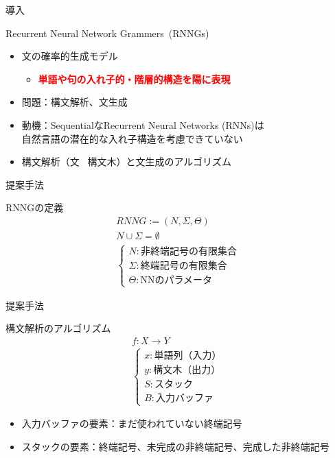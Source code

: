 \documentclass[aspectratio=43,unicode,10pt]{beamer}
\title{\thetitle}
\institute{知能数理研究室}
\author{外山洋太、三輪誠、佐々木裕}
\date{\today}
\newcommand{\fire}[1]{\textcolor{red}{\textbf{#1}}}
\newcommand{\opennt}{未完成の非終端記号}
\newcommand{\thetitle}{Recurrent Neural Network Grammers}
\begin{document}
\begin{frame}
  \titlepage
\end{frame}

\begin{frame}{導入}
  \begin{block}{\thetitle~(RNNGs)}
    \begin{itemize}
      \item 文の確率的生成モデル
        \begin{itemize}
          \item \fire{単語や句の入れ子的・階層的構造を陽に表現}
        \end{itemize}
      \item 問題：構文解析、文生成
      \item 動機：SequentialなRecurrent Neural Networks (RNNs)は \\
            自然言語の潜在的な入れ子構造を考慮できていない
      \item 構文解析（文 \rightarrow~構文木）と文生成のアルゴリズム
    \end{itemize}
  \end{block}
\end{frame}

\begin{frame}{提案手法}
  \begin{block}{RNNGの定義}
    \begin{gather*}
      RNNG := (N, \Sigma, \Theta) \\
      N \cup \Sigma = \emptyset \\
      \begin{cases}
        N: \text{非終端記号の有限集合} \\
        \Sigma: \text{終端記号の有限集合} \\
        \Theta: \text{NNのパラメータ}
      \end{cases}
    \end{gather*}
  \end{block}
\end{frame}

\begin{frame}{提案手法}
  \begin{block}{構文解析のアルゴリズム}
    \begin{gather*}
      f: X \rightarrow Y \\
      \begin{cases}
        x: \text{単語列（入力）} \\
        y: \text{構文木（出力）} \\
        S: \text{スタック} \\
        B: \text{入力バッファ}
      \end{cases}
    \end{gather*}
    \begin{itemize}
      \item 入力バッファの要素：まだ使われていない終端記号
      \item スタックの要素：終端記号、\opennt、完成した非終端記号
    \end{itemize}
  \end{block}
\end{frame}
\end{document}
